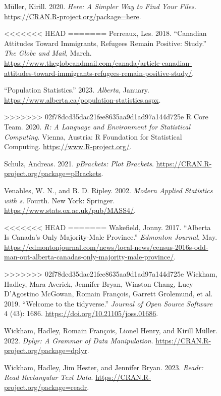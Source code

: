 \documentclass[
]{article}
\newlength{\cslhangindent}
\newlength{\cslentryspacingunit} %
\newenvironment{CSLReferences}[2] %
 {%
  \setlength{\parindent}{0pt}
  \ifodd #1
  \let\oldpar\par
  \def\par{\hangindent=\cslhangindent\oldpar}
  \fi
  \setlength{\parskip}{#2\cslentryspacingunit}
 }%
 {}
\begin{document}
\begin{figure}
\begin{CSLReferences}{1}{0}
\leavevmode{}%
Müller, Kirill. 2020. \emph{Here: A Simpler Way to Find Your Files}.
\url{https://CRAN.R-project.org/package=here}.

<<<<<<< HEAD
=======
\leavevmode{}%
Perreaux, Les. 2018. {``Canadian Attitudes Toward Immigrants, Refugees
Remain Positive: Study.''} \emph{The Globe and Mail}, March.
\url{https://www.theglobeandmail.com/canada/article-canadian-attitudes-toward-immigrants-refugees-remain-positive-study/}.

\leavevmode{}%
{``Population Statistics.''} 2023. \emph{Alberta}, January.
\url{https://www.alberta.ca/population-statistics.aspx}.

>>>>>>> 02f78dcd35dac21fee8635aa9d1ad97a144d725e
\leavevmode{}%
R Core Team. 2020. \emph{R: A Language and Environment for Statistical
Computing}. Vienna, Austria: R Foundation for Statistical Computing.
\url{https://www.R-project.org/}.

\leavevmode{}%
Schulz, Andreas. 2021. \emph{pBrackets: Plot Brackets}.
\url{https://CRAN.R-project.org/package=pBrackets}.

\leavevmode{}%
Venables, W. N., and B. D. Ripley. 2002. \emph{Modern Applied Statistics
with s}. Fourth. New York: Springer.
\url{https://www.stats.ox.ac.uk/pub/MASS4/}.

<<<<<<< HEAD
=======
\leavevmode{}%
Wakefield, Jonny. 2017. {``Alberta Is Canada's Only Majority-Male
Province.''} \emph{Edmonton Journal}, May.
\url{https://edmontonjournal.com/news/local-news/census-2016s-odd-man-out-alberta-canadas-only-majority-male-province/}.

>>>>>>> 02f78dcd35dac21fee8635aa9d1ad97a144d725e
\leavevmode{}%
Wickham, Hadley, Mara Averick, Jennifer Bryan, Winston Chang, Lucy
D'Agostino McGowan, Romain François, Garrett Grolemund, et al. 2019.
{``Welcome to the {tidyverse}.''} \emph{Journal of Open Source Software}
4 (43): 1686. \url{https://doi.org/10.21105/joss.01686}.

\leavevmode{}%
Wickham, Hadley, Romain François, Lionel Henry, and Kirill Müller. 2022.
\emph{Dplyr: A Grammar of Data Manipulation}.
\url{https://CRAN.R-project.org/package=dplyr}.

\leavevmode{}%
Wickham, Hadley, Jim Hester, and Jennifer Bryan. 2023. \emph{Readr: Read
Rectangular Text Data}. \url{https://CRAN.R-project.org/package=readr}.


\end{CSLReferences}
\end{figure}
\end{document}
